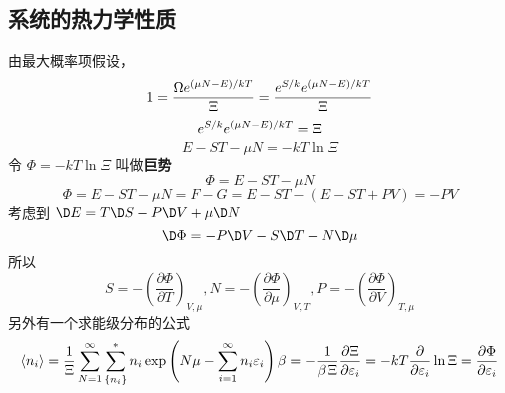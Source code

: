 \subsection{系统的热力学性质}
由最大概率项假设，
\begin{equation}
1 = \frac{{\Omega {e^{{{\left( {\mu N - E} \right)} \mathord{\left/
 {\vphantom {{\left( {\mu N - E} \right)} {kT}}} \right.
 \kern-\nulldelimiterspace} {kT}}}}}}{\Xi } = \frac{{{e^{S/k}}{e^{{{\left( {\mu N - E} \right)} \mathord{\left/
 {\vphantom {{\left( {\mu N - E} \right)} {kT}}} \right.
 \kern-\nulldelimiterspace} {kT}}}}}}{\Xi }
\end{equation}
\begin{equation} 
 {e^{S/k}}{e^{{{\left( {\mu N - E} \right)} \mathord{\left/
 {\vphantom {{\left( {\mu N - E} \right)} {kT}}} \right.
 \kern-\nulldelimiterspace} {kT}}}} = \Xi 
\end{equation}
\begin{equation} 
 E - ST - \mu N =  - kT\ln \Xi
\end{equation}
令 $\Phi  =  - kT\ln \Xi $ 叫做\textbf{巨势}
\begin{equation}
 \Phi  = E - ST - \mu N
\end{equation}
\begin{equation}
\Phi  = E - ST - \mu N = F - G = E - ST - (E - ST + PV) =  - PV
\end{equation}
考虑到 $ \D E = T\D S - P\D V + \mu \D N$
\begin{equation}
\D \Phi  =  - P\D V - S\D T - N\D \mu
\end{equation}
所以
\begin{equation}
S =  - {\left( {\frac{{\partial \Phi }}{{\partial T}}} \right)_{V,\mu }} , N =  - {\left( {\frac{{\partial \Phi }}{{\partial \mu }}} \right)_{V,T}} , P =  - {\left( {\frac{{\partial \Phi }}{{\partial V}}} \right)_{T,\mu }}
\end{equation}
另外有一个求能级分布的公式
\begin{equation}
\left\langle {{n_i}} \right\rangle  = \frac{1}{\Xi }\sum\limits_{N = 1}^\infty  {\sum\limits_{\{ {n_i}\} }^ *  {{n_i}\exp \left( {N\mu  - \sum\limits_{i = 1}^\infty  {{n_i}{\varepsilon _i}} } \right)\beta } }  =  - \frac{1}{{\beta {\kern 1pt} \Xi }}\frac{{\partial \Xi }}{{\partial {\varepsilon _i}}} =  - kT\frac{\partial }{{\partial {\varepsilon _i}}}\ln \Xi  = \frac{{\partial \Phi }}{{\partial {\varepsilon _i}}}
\end{equation}